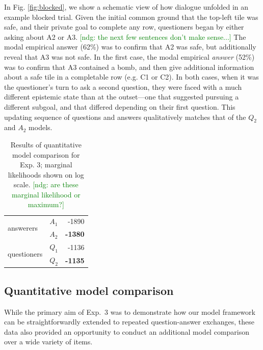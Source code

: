\documentclass[11pt, floatsintext]{apa6}
\newcommand{\ndg}[1]{\textcolor{Green}{[ndg: #1]}}
\begin{document}
In Fig. \ref{fig:blocked}, we show a schematic view of how dialogue unfolded in an example blocked trial.
Given the initial common ground that the top-left tile was safe, and their private goal to complete any row, questioners began by either asking about A2 or A3.
\ndg{the next few sentences don't make sense...}
The modal empirical answer (62\%) was to confirm that A2 was safe, but additionally reveal that A3 was not safe.
In the first case, the modal empirical \emph{answer} (52\%) was to confirm that A3 contained a bomb, and then give additional information about a safe tile in a completable row (e.g. C1 or C2).  
In both cases, when it was the questioner's turn to ask a second question, they were faced with a much different epistemic state than at the outset---one that suggested pursuing a different subgoal, and that differed depending on their first question. 
This updating sequence of questions and answers qualitatively matches that of the $Q_2$ and $A_2$ models.

\begin{table}[]
\begin{center}
\begin{tabular}{@{}llr@{}}
\toprule
\multirow{2}{*}{answerers} & $A_1$ & -1890 \\ \cmidrule(l){2-3} 
 & $A_2$ & \textbf{-1380} \\ \midrule
\multirow{2}{*}{questioners} & $Q_1$ & -1136  \\ \cmidrule(l){2-3} 
 & $Q_2$ & \textbf{-1135} \\ \bottomrule
\end{tabular}
\end{center}
\caption{Results of quantitative model comparison for Exp. 3; marginal likelihoods shown on log scale. \ndg{are these marginal likelihood or maximum?}}
\label{table:exp3likelihoods}
\end{table}

\subsection{Quantitative model comparison}

While the primary aim of Exp.~3 was to demonstrate how our model framework can be straightforwardly extended to repeated question-answer exchanges, these data also provided an opportunity to conduct an additional model comparison over a wide variety of items.
\end{document}
